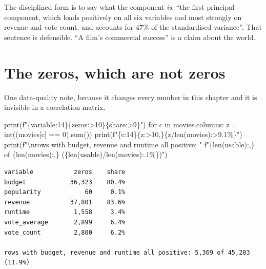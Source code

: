 \documentclass[
  letterpaper,
  10pt,
  twoside,
  openright,
  numbers=noenddot,
  chapterprefix=true]{scrbook}
\newenvironment{Shaded}{}{}
\newcommand{\BuiltInTok}[1]{\textcolor[rgb]{0.84,0.23,0.29}{#1}}
\newcommand{\CharTok}[1]{\textcolor[rgb]{0.01,0.18,0.38}{#1}}
\newcommand{\ControlFlowTok}[1]{\textcolor[rgb]{0.84,0.23,0.29}{#1}}
\newcommand{\DecValTok}[1]{\textcolor[rgb]{0.00,0.36,0.77}{#1}}
\newcommand{\KeywordTok}[1]{\textcolor[rgb]{0.84,0.23,0.29}{#1}}
\newcommand{\NormalTok}[1]{\textcolor[rgb]{0.14,0.16,0.18}{#1}}
\newcommand{\OperatorTok}[1]{\textcolor[rgb]{0.14,0.16,0.18}{#1}}
\newcommand{\SpecialCharTok}[1]{\textcolor[rgb]{0.00,0.36,0.77}{#1}}
\newcommand{\SpecialStringTok}[1]{\textcolor[rgb]{0.01,0.18,0.38}{#1}}
\newcommand{\StringTok}[1]{\textcolor[rgb]{0.01,0.18,0.38}{#1}}
\begin{document}
The disciplined form is to say what the component \emph{is}: ``the first
principal component, which loads positively on all six variables and
most strongly on revenue and vote count, and accounts for 47\% of the
standardised variance''. That sentence is defensible. ``A film's
commercial success'' is a claim about the world.

\section{The zeros, which are not
zeros}\label{the-zeros-which-are-not-zeros}

One data-quality note, because it changes every number in this chapter
and it is invisible in a correlation matrix.

\label{check-zeros}
\begin{Shaded}
\begin{Highlighting}[]
\BuiltInTok{print}\NormalTok{(}\SpecialStringTok{f"}\SpecialCharTok{\{}\StringTok{\textquotesingle{}variable\textquotesingle{}}\SpecialCharTok{:14\}\{}\StringTok{\textquotesingle{}zeros\textquotesingle{}}\SpecialCharTok{:\textgreater{}10\}\{}\StringTok{\textquotesingle{}share\textquotesingle{}}\SpecialCharTok{:\textgreater{}9\}}\SpecialStringTok{"}\NormalTok{)}
\ControlFlowTok{for}\NormalTok{ c }\KeywordTok{in}\NormalTok{ movies.columns:}
\NormalTok{    z }\OperatorTok{=} \BuiltInTok{int}\NormalTok{((movies[c] }\OperatorTok{==} \DecValTok{0}\NormalTok{).}\BuiltInTok{sum}\NormalTok{())}
    \BuiltInTok{print}\NormalTok{(}\SpecialStringTok{f"}\SpecialCharTok{\{}\NormalTok{c}\SpecialCharTok{:14\}\{}\NormalTok{z}\SpecialCharTok{:\textgreater{}10,\}\{}\NormalTok{z}\OperatorTok{/}\BuiltInTok{len}\NormalTok{(movies)}\SpecialCharTok{:\textgreater{}9.1\%\}}\SpecialStringTok{"}\NormalTok{)}
\BuiltInTok{print}\NormalTok{(}\SpecialStringTok{f"}\CharTok{\textbackslash{}n}\SpecialStringTok{rows with budget, revenue and runtime all positive: "}
      \SpecialStringTok{f"}\SpecialCharTok{\{}\BuiltInTok{len}\NormalTok{(usable)}\SpecialCharTok{:,\}}\SpecialStringTok{ of }\SpecialCharTok{\{}\BuiltInTok{len}\NormalTok{(movies)}\SpecialCharTok{:,\}}\SpecialStringTok{ (}\SpecialCharTok{\{}\BuiltInTok{len}\NormalTok{(usable)}\OperatorTok{/}\BuiltInTok{len}\NormalTok{(movies)}\SpecialCharTok{:.1\%\}}\SpecialStringTok{)"}\NormalTok{)}
\end{Highlighting}
\end{Shaded}

\begin{verbatim}
variable           zeros    share
budget            36,323    80.4%
popularity            60     0.1%
revenue           37,801    83.6%
runtime            1,558     3.4%
vote_average       2,899     6.4%
vote_count         2,800     6.2%

rows with budget, revenue and runtime all positive: 5,369 of 45,203 (11.9%)
\end{verbatim}
\end{document}
